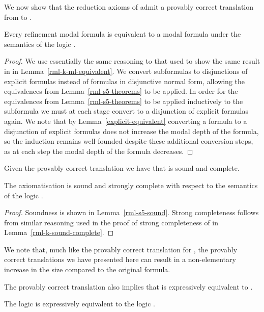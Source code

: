 We now show that the reduction axioms of \logicRmlS{} admit a provably correct translation from \langRml{} to \langMl{}.

\begin{lemma}\label{rml-s5-ml-equivalent}
Every refinement modal formula is equivalent to a modal formula under the semantics of the logic \logicRmlS{}.
\end{lemma}

\begin{proof}
We use essentially the same reasoning to that used to show the same result in \axiomRmlK{} in Lemma~\ref{rml-k-ml-equivalent}.
We convert subformulas to disjunctions of explicit formulas instead of formulas in disjunctive normal form, allowing the equivalences from Lemma~\ref{rml-s5-theorems} to be applied.
In order for the equivalences from Lemma~\ref{rml-s5-theorems} to be applied inductively to the subformula we must at each stage convert to a disjunction of explicit formulas again.
We note that by Lemma~\ref{explicit-equivalent} converting a formula to a disjunction of explicit formulas does not increase the modal depth of the formula, so the induction remains well-founded despite these additional conversion steps, as at each step the modal depth of the formula decreases.
\end{proof}

\pagebreak

Given the provably correct translation we have that \axiomRmlS{} is sound and complete.

\begin{theorem}
The axiomatisation \axiomRmlS{} is sound and strongly complete with respect to the semantics of the logic \logicRmlS{}.
\end{theorem}

\begin{proof}
Soundness is shown in Lemma~\ref{rml-s5-sound}.
Strong completeness follows from similar reasoning used in the proof of strong completeness of \logicRmlK{} in Lemma~\ref{rml-k-sound-complete}.
\end{proof}

We note that, much like the provably correct translation for \logicRmlK{}, the provably correct translations we have presented here can result in a non-elementary increase in the size compared to the original formula.

The provably correct translation also implies that \logicRmlS{} is expressively equivalent to \logicS{}.

\begin{corollary}
The logic \logicRmlS{} is expressively equivalent to the logic \logicS{}.
\end{corollary}

